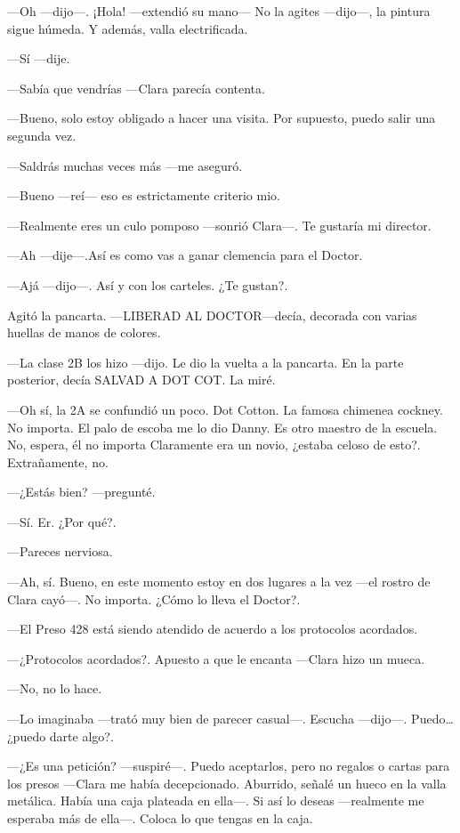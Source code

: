 ---Oh ---dijo---. ¡Hola! ---extendió su mano--- No la agites ---dijo---,
la pintura sigue húmeda. Y además, valla electrificada.

---Sí ---dije.

---Sabía que vendrías ---Clara parecía contenta.

---Bueno, solo estoy obligado a hacer una visita. Por supuesto, puedo
salir una segunda vez.

---Saldrás muchas veces más ---me aseguró.

---Bueno ---reí--- eso es estrictamente criterio mio.

---Realmente eres un culo pomposo ---sonrió Clara---. Te gustaría mi
director.

---Ah ---dije---.Así es como vas a ganar clemencia para el Doctor.

---Ajá ---dijo---. Así y con los carteles. ¿Te gustan?.

Agitó la pancarta. ---LIBERAD AL DOCTOR---decía, decorada con varias
huellas de manos de colores.

---La clase 2B los hizo ---dijo. Le dio la vuelta a la pancarta. En la
parte posterior, decía SALVAD A DOT COT. La miré.

---Oh sí, la 2A se confundió un poco. Dot Cotton. La famosa chimenea
cockney. No importa. El palo de escoba me lo dio Danny. Es otro maestro
de la escuela. No, espera, él no importa Claramente era un novio,
¿estaba celoso de esto?. Extrañamente, no.

---¿Estás bien? ---pregunté.

---Sí. Er. ¿Por qué?.

---Pareces nerviosa.

---Ah, sí. Bueno, en este momento estoy en dos lugares a la vez ---el
rostro de Clara cayó---. No importa. ¿Cómo lo lleva el Doctor?.

---El Preso 428 está siendo atendido de acuerdo a los protocolos
acordados.

---¿Protocolos acordados?. Apuesto a que le encanta ---Clara hizo un
mueca.

---No, no lo hace.

---Lo imaginaba ---trató muy bien de parecer casual---. Escucha
---dijo---. Puedo\ldots{} ¿puedo darte algo?.

---¿Es una petición? ---suspiré---. Puedo aceptarlos, pero no regalos o
cartas para los presos ---Clara me había decepcionado. Aburrido, señalé
un hueco en la valla metálica. Había una caja plateada en ella---. Si
así lo deseas ---realmente me esperaba más de ella---. Coloca lo que
tengas en la caja.

